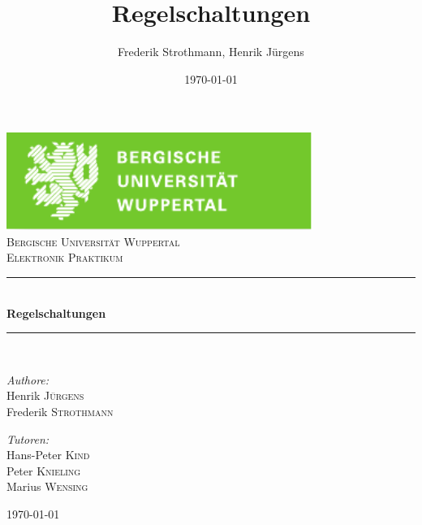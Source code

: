 \documentclass[12pt,a4paper]{article}
\title{Regelschaltungen}
\author{Frederik Strothmann, Henrik Jürgens}
\date{\today}
\begin{document}
\begin{titlepage}

\begin{center}
\includegraphics[width=0.75\textwidth]{logo.pdf}\\[1cm]    	%

\textsc{\LARGE Bergische Universität Wuppertal}\\[1.5cm]	%

\textsc{\Large Elektronik Praktikum}\\[0.5cm]				%


\newcommand{\HRule}{\rule{\linewidth}{0.5mm}}
\HRule \\[0.4cm]
{ \huge \bfseries Regelschaltungen}\\[0.4cm]				%

\HRule \\[1.5cm]

\begin{minipage}{0.4\textwidth}
\begin{flushleft} \large
\emph{Authore:}\\
Henrik \textsc{Jürgens} \\
Frederik \textsc{Strothmann}
\end{flushleft}
\end{minipage}
\hfill
\begin{minipage}{0.4\textwidth}
\begin{flushright} \large
\emph{Tutoren:} \\
Hans-Peter \textsc{Kind} \\
Peter \textsc{Knieling} \\
Marius \textsc{Wensing}
\end{flushright}
\end{minipage}

\vfill

{\large \today}

\end{center}

\end{titlepage}


\newpage
\tableofcontents
\newpage
\end{document}
